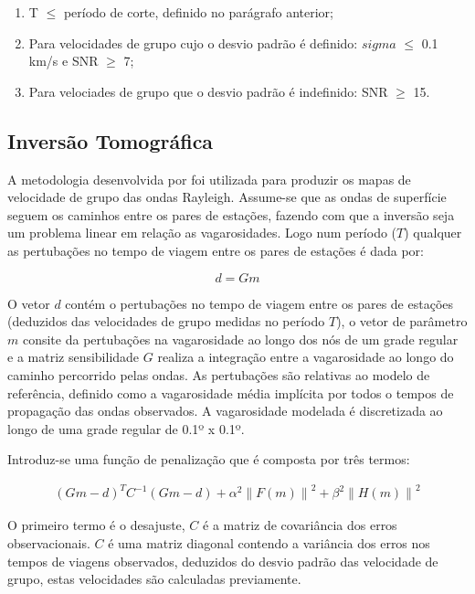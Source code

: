 \begin{enumerate}
\item T $\leq$ período de corte, definido no parágrafo anterior;

\item Para velocidades de grupo cujo o desvio padrão é definido: $sigma$ $\leq$ 0.1 km/s e SNR $\geq$ 7;

\item Para velociades de grupo que o desvio padrão é indefinido: SNR $\geq$ 15.
\end{enumerate}

\subsection{Inversão Tomográfica}

A metodologia desenvolvida por  \cite{barmin_fast_2001} foi utilizada para produzir os mapas de velocidade de grupo das ondas Rayleigh. Assume-se que as ondas de superfície seguem os caminhos entre os pares de estações, fazendo com que a inversão seja um problema linear em relação as vagarosidades. Logo num período ($T$) qualquer as pertubações no tempo de viagem entre os pares de estações é dada por:

\begin{equation}
d=Gm
\end{equation} 

O vetor $d$ contém o pertubações no tempo de viagem entre os pares de estações (deduzidos das velocidades de grupo medidas no período $T$), o vetor de parâmetro $m$ consite da pertubações na vagarosidade ao longo dos nós de um grade regular e a matriz sensibilidade $G$ realiza a integração entre a vagarosidade ao longo do caminho percorrido pelas ondas. As pertubações são relativas ao modelo de referência, definido como a vagarosidade média implícita por todos o tempos de propagação das ondas observados. A vagarosidade modelada é discretizada ao longo de uma grade regular de 0.1º x 0.1º. 

Introduz-se uma função de penalização que é composta por três termos:

\begin{eqnarray}
(Gm-d)^{T}C^{-1}(Gm-d) + \alpha ^{2} \left \| F(m)  \right \| ^{2} + \beta ^{2 } \left \| H(m)  \right \| ^{2}
\end{eqnarray}

O primeiro termo é o desajuste, $C$ é a matriz de covariância dos erros observacionais. $C$ é uma matriz diagonal contendo a variância dos erros nos tempos de viagens observados, deduzidos do desvio padrão das velocidade de grupo, estas velocidades são calculadas previamente. 

